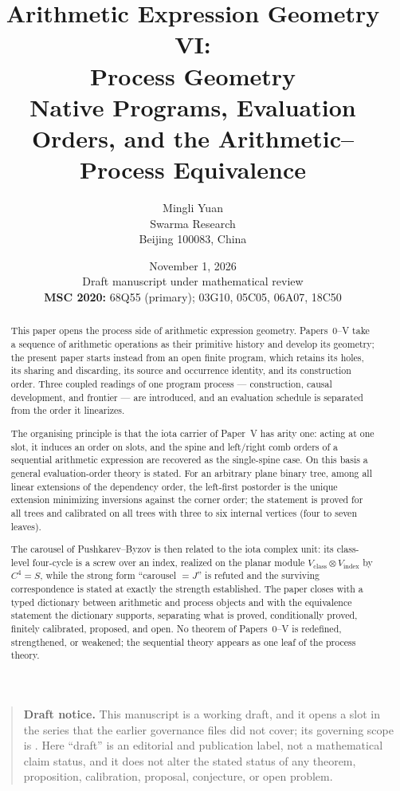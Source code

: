 \documentclass[11pt]{article}
\title{\textbf{Arithmetic Expression Geometry VI:\\Process Geometry}\\[0.45em]
\large Native Programs, Evaluation Orders, and the Arithmetic--Process Equivalence}
\author{Mingli Yuan\\Swarma Research\\Beijing 100083, China}
\date{November 1, 2026\\[0.25em]
\small Draft manuscript under mathematical review\\[0.35em]
\small
\textbf{MSC 2020:} 68Q55 (primary); 03G10, 05C05, 06A07, 18C50}
\theoremstyle{definition}
\theoremstyle{remark}
\begin{document}
\maketitle

\begin{quote}\small\sloppy
\textbf{Draft notice.}
This manuscript is a working draft, and it opens a slot in the series that the
earlier governance files did not cover; its governing scope is
.  Here ``draft'' is an
editorial and publication label, not a mathematical claim status, and it does not
alter the stated status of any theorem, proposition, calibration, proposal,
conjecture, or open problem.
\end{quote}

\begin{abstract}This paper opens the process side of arithmetic expression geometry.
Papers~0--V take a sequence of arithmetic operations as their primitive history and
develop its geometry; the present paper starts instead from an open finite program,
which retains its holes, its sharing and discarding, its source and occurrence
identity, and its construction order.  Three coupled readings of one program process
--- construction, causal development, and frontier --- are introduced, and an
evaluation schedule is separated from the order it linearizes.

The organising principle is that the iota carrier of Paper~V has arity one: acting at
one slot, it induces an order on slots, and the spine and left/right comb orders of a
sequential arithmetic expression are recovered as the single-spine case.  On this
basis a general evaluation-order theory is stated.  For an arbitrary plane binary
tree, among all linear extensions of the dependency order, the left-first postorder
is the unique extension minimizing inversions against the corner order; the statement
is proved for all trees and calibrated on all trees with three to six internal
vertices (four to seven leaves).

The carousel of Pushkarev--Byzov is then related to the iota complex unit: its
class-level four-cycle is a screw over an index, realized on the planar module
$V_{\mathrm{class}}\otimes V_{\mathrm{index}}$ by $C^{4}=S$, while the strong form
``carousel $=J$'' is refuted and the surviving correspondence is stated at exactly
the strength established.  The paper closes with a typed dictionary between
arithmetic and process objects and with the equivalence statement the dictionary
supports, separating what is proved, conditionally proved, finitely calibrated,
proposed, and open.  No theorem of Papers~0--V is redefined, strengthened, or
weakened; the sequential theory appears as one leaf of the process theory.
\end{abstract}
\end{document}
